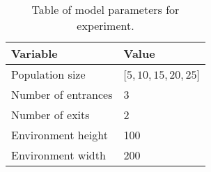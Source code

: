 \begin{table}[h]
    \centering
    \begin{tabular}{@{}ll@{}}
    \toprule
        Variable            & Value                 \\ \midrule
        Population size     & $[5, 10, 15, 20, 25$] \\
        Number of entrances & 3                     \\
        Number of exits     & 2                     \\
        Environment height  & 100                   \\
        Environment width   & 200                   \\ \bottomrule
    \end{tabular}
    \caption{Table of model parameters for experiment.}\label{tab:model_params}
    \label{tab:model_params}
\end{table}





